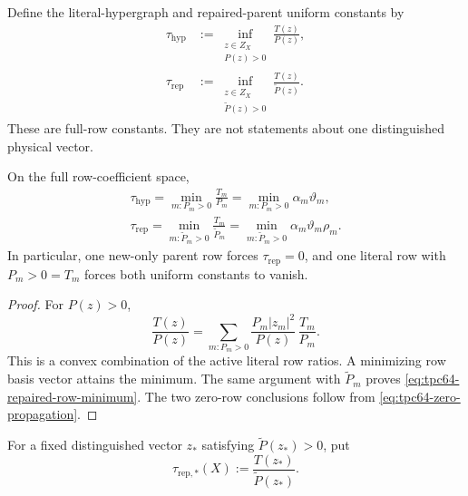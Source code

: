 Define the literal-hypergraph and repaired-parent uniform constants by
\begin{align}
 \tau_{\mathrm{hyp}}
 &:=
 \inf_{\substack{z\in Z_X\\P(z)>0}}
       \frac{T(z)}{P(z)},
 \label{eq:tpc64-hypergraph-uniform-activation}\\
 \tau_{\mathrm{rep}}
 &:=
 \inf_{\substack{z\in Z_X\\\widetilde P(z)>0}}
       \frac{T(z)}{\widetilde P(z)}.
 \label{eq:tpc64-repaired-uniform-activation}
\end{align}
These are full-row constants.  They are not statements about one
distinguished physical vector.

\begin{theorem}
\label{thm:tpc64-uniform-activation-minima}
On the full row-coefficient space,
\begin{align}
 \boxed{
 \tau_{\mathrm{hyp}}
 =\min_{m:P_m>0}\frac{T_m}{P_m}
 =\min_{m:P_m>0}\alpha_m\vartheta_m,}
 \label{eq:tpc64-hypergraph-row-minimum}\\
 \boxed{
 \tau_{\mathrm{rep}}
 =\min_{m:\widetilde P_m>0}\frac{T_m}{\widetilde P_m}
 =\min_{m:\widetilde P_m>0}
       \alpha_m\vartheta_m\rho_m.}
 \label{eq:tpc64-repaired-row-minimum}
\end{align}
In particular, one new-only parent row forces
\(\tau_{\mathrm{rep}}=0\), and one literal row with
\(P_m>0=T_m\) forces both uniform constants to vanish.
\end{theorem}

\begin{proof}
For \(P(z)>0\),
\[
 \frac{T(z)}{P(z)}
 =
 \sum_{m:P_m>0}
 \frac{P_m|z_m|^2}{P(z)}\,\frac{T_m}{P_m}.
\]
This is a convex combination of the active literal row ratios.  A
minimizing row basis vector attains the minimum.  The same argument with
\(\widetilde P_m\) proves
\eqref{eq:tpc64-repaired-row-minimum}.  The two zero-row conclusions follow
from \eqref{eq:tpc64-zero-propagation}.
\end{proof}

For a fixed distinguished vector \(z_*\) satisfying
\(\widetilde P(z_*)>0\), put
\begin{equation}
 \tau_{\mathrm{rep},*}(X)
 :=\frac{T(z_*)}{\widetilde P(z_*)}.
 \label{eq:tpc64-distinguished-repaired-activation}
\end{equation}

